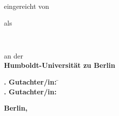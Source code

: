 \makeatletter
\begin{titlepage}
	\doublespacing
	\centering%
	\textbf{\Huge\sffamily \@title}\vskip 2.5mm

	\textbf{\Large\sffamily \@subtitle}
	\vfill

	{\large eingereicht von}\\ \resizebox{%
	\ifdim\width>\textwidth \textwidth \else \width \fi }{!}{%
	\textbf{\Large\sffamily \@author}}
	\vfill

	{\large als}\\ \textbf{\Large\sffamily\degreevar}
	\vfill

	{\large\degreecontextvar}\\
	\resizebox{%
	\ifdim\width>\textwidth \textwidth \else \width \fi }{!}{%
	\textbf{\Large\sffamily\programmevar}}
	\vfill

	{\large an der}\\ \textbf{\Large\sffamily Humboldt-Universität zu Berlin}
	\vfill

	\resizebox{%
	\ifdim\width>\textwidth \textwidth \else \width \fi }{!}{%
	\textbf{\Large\sffamily\facultyvar}}

	\resizebox{%
	\ifdim\width>\textwidth \textwidth \else \width \fi }{!}{%
	\textbf{\Large\sffamily\institutevar}}
	\vfill

	\parbox{0cm}{\large%
	\begin{tabbing}
		\textbf{. Gutachter/in:} \= \firstsupervisorvar  \\
		\textbf{. Gutachter/in:} \> \secondsupervisorvar
	\end{tabbing}
	}
	\vfill

	\textbf{\large\sffamily Berlin, \@date}
\end{titlepage}
\makeatother